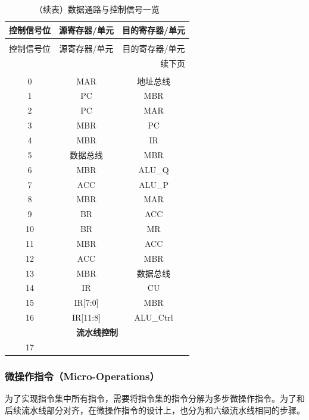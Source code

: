 \documentclass[lang=cn,a4paper,newtx]{elegantpaper}
\begin{document}
\begin{longtable}{c c c}
  \caption{数据通路与控制信号一览} \label{tab:CPU:DataPath} \\
  \toprule
  控制信号位 & 源寄存器/单元  & 目的寄存器/单元   \\
  \midrule
  \endfirsthead

  \caption[]{（续表）数据通路与控制信号一览} \\
  \toprule
  控制信号位 & 源寄存器/单元  & 目的寄存器/单元  \\
  \midrule
  \endhead

  \midrule
  \multicolumn{3}{r}{续下页} \\
  \midrule
  \endfoot

  \bottomrule
  \endlastfoot

  \multicolumn{3}{c}{\textbf{基本控制}}\\
  \midrule
  0  & MAR   & 地址总线  \\
  1  & PC    & MBR  \\
  2  & PC    & MAR  \\
  3  & MBR   & PC  \\
  4  & MBR   & IR  \\
  5  & 数据总线 & MBR  \\
  6  & MBR   & ALU\_Q \\
  7  & ACC   & ALU\_P  \\
  8  & MBR   & MAR  \\
  9  & BR   & ACC  \\
  10 & BR   & MR    \\
  11 & MBR   & ACC  \\
  12 & ACC   & MBR  \\
  13 & MBR   & 数据总线  \\
  14 & IR    & CU  \\
  15 & IR[7:0]    & MBR \\
  16 & IR[11:8]    & ALU\_Ctrl \\
  \midrule
  \multicolumn{3}{c}{\textbf{流水线控制}} \\
  \midrule
  17 & & \\

\end{longtable}

\subsubsection{微操作指令（Micro-Operations）}
为了实现指令集中所有指令，需要将指令集的指令分解为多步微操作指令。为了和后续流水线部分对齐，在微操作指令的设计上，也分为和六级流水线相同的步骤。
\end{document}
